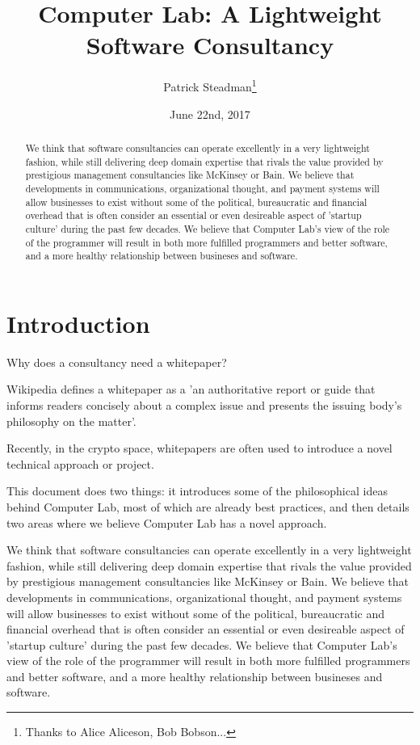 \documentclass[12pt]{article}
\title{Computer Lab: A Lightweight Software Consultancy}
\author{Patrick Steadman\thanks{Thanks to Alice Aliceson, Bob Bobson...}}
\date{June 22nd, 2017}
\begin{document}
\maketitle

\begin{abstract}
We think that software consultancies can operate excellently in a very
lightweight fashion, while still delivering deep domain expertise that rivals
the value provided by prestigious management consultancies like McKinsey or
Bain. We believe that developments in communications, organizational thought,
and payment systems will allow businesses to exist without some of the
political, bureaucratic and financial overhead that is often consider an
essential or even desireable aspect of 'startup culture' during the past few
decades. We believe that Computer Lab's view of the role of the programmer will
result in both more fulfilled programmers and better software, and a more
healthy relationship between busineses and software.
\end{abstract}

\section{Introduction}

Why does a consultancy need a whitepaper?

Wikipedia defines a whitepaper as a 'an authoritative report or guide that
informs readers concisely about a complex issue and presents the issuing body's
philosophy on the matter'.

Recently, in the crypto space, whitepapers are often used to introduce a novel
technical approach or project.

This document does two things: it introduces some of the philosophical ideas
behind Computer Lab, most of which are already best practices, and then details
two areas where we believe Computer Lab has a novel approach.

We think that software consultancies can operate excellently in a very
lightweight fashion, while still delivering deep domain expertise that rivals
the value provided by prestigious management consultancies like McKinsey or
Bain. We believe that developments in communications, organizational thought,
and payment systems will allow businesses to exist without some of the
political, bureaucratic and financial overhead that is often consider an
essential or even desireable aspect of 'startup culture' during the past few
decades. We believe that Computer Lab's view of the role of the programmer will
result in both more fulfilled programmers and better software, and a more
healthy relationship between busineses and software.
\end{document}
